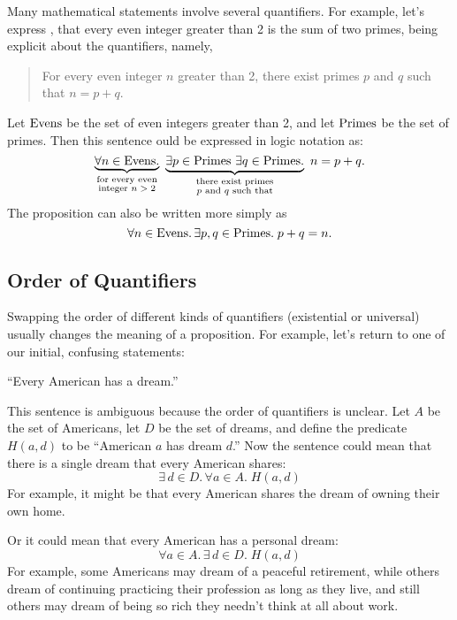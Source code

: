 \begin{editingnoes}
Many mathematical statements involve several quantifiers.  For
example, let's express , that every even
integer greater than 2 is the sum of two primes, being explicit about
the quantifiers, namely,
%
\begin{quote}
For every even integer $n$ greater than 2, there exist primes $p$ and
$q$ such that $n = p + q$.
\end{quote}
Let $\text{Evens}$ be the set of even integers greater than 2, and let
$\text{Primes}$ be the set of primes.  Then this sentence
ould be expressed in logic notation as:
%
\begin{equation}\label{AEEGC}
\underbrace{\forall n \in \text{Evens}.}_{\substack
    {\text{for every even} \\
     \text{integer $n > 2$}}}
\
\underbrace{\exists p \in \text{Primes}\ \exists q \in \text{Primes}.}_{\substack
    {\text{there exist primes} \\
     \text{$p$ and $q$ such that}}}
\ n = p + q.
\end{equation}
The proposition can also be written more simply as
\[
 \forall n \in \text{Evens}.\, \exists p, q \in \text{Primes}. \; p + q = n.
\]

\subsection{Order of Quantifiers}

Swapping the order of different kinds of quantifiers (existential or
universal) usually changes the meaning of a proposition.  For example,
let's return to one of our initial, confusing statements:
\begin{center}
``Every American has a dream.''
\end{center}

This sentence is ambiguous because the order of quantifiers is
unclear.  Let $A$ be the set of Americans, let $D$ be the set of
dreams, and define the predicate $H(a, d)$ to be ``American $a$ has
dream $d$.''  Now the sentence could mean that there is a single dream
that every American shares:
\[
\exists\, d \in D.\, \forall a \in A.\; H(a, d)
\]
For example, it might be that every American shares the dream of owning
their own home.

Or it could mean that every American has a personal dream:
\[
\forall a \in A.\, \exists\, d \in D.\; H(a, d)
\]
For example, some Americans may dream of a peaceful retirement, while
others dream of continuing practicing their profession as long as they
live, and still others may dream of being so rich they needn't think at
all about work.


\end{editingnoes}
